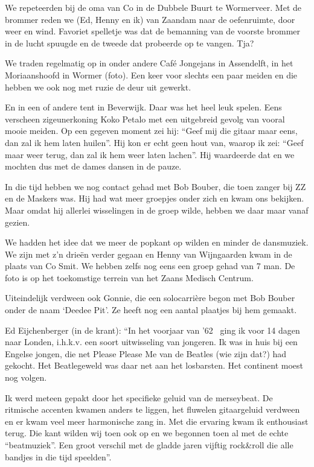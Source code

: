 \documentclass[10pt,twoside,openright]{memoir}
\begin{document}
We repeteerden bij de oma van Co in de Dubbele Buurt te Wormerveer. Met de brommer reden we (Ed, Henny en ik) van Zaandam naar de oefenruimte, door weer en wind. Favoriet spelletje was dat de bemanning van de voorste brommer in de lucht spuugde en de tweede dat probeerde op te vangen. Tja?

We traden regelmatig op in onder andere Café Jongejans in Assendelft, in het Moriaanshoofd in Wormer (foto). Een keer voor slechts een paar meiden en die hebben we ook nog met ruzie de deur uit gewerkt. 

En in een of andere tent in Beverwijk. Daar was het heel leuk spelen. Eens verscheen zigeunerkoning Koko Petalo met een uitgebreid gevolg van vooral mooie meiden. Op een gegeven moment zei hij: “Geef mij die gitaar maar eens, dan zal ik hem laten huilen”. Hij kon er echt geen hout van, waarop ik zei: “Geef maar weer terug, dan zal ik hem weer laten lachen”. Hij waardeerde dat en we mochten dus met de dames dansen in de pauze.

In die tijd hebben we nog contact gehad met Bob Bouber, die toen zanger bij ZZ en de Maskers was. Hij had wat meer groepjes onder zich en kwam ons bekijken. Maar omdat hij allerlei wisselingen in de groep wilde, hebben we daar maar vanaf gezien. 

We hadden het idee dat we meer de popkant op wilden en minder de dansmuziek. We zijn met z’n drieën verder gegaan en Henny van Wijngaarden kwam in de plaats van Co Smit. We hebben zelfs nog eens een groep gehad van 7 man. De foto is op het toekomstige terrein van het Zaans Medisch Centrum.

Uiteindelijk verdween ook Gonnie, die een solocarrière begon met Bob Bouber onder de naam ‘Deedee Pit’. Ze heeft nog een aantal plaatjes bij hem gemaakt.

Ed Eijchenberger (in de krant): “In het voorjaar van ’62  ging ik voor 14 dagen naar Londen, i.h.k.v. een soort uitwisseling van jongeren. Ik was in huis bij een Engelse jongen, die net Please Please Me van de Beatles (wie zijn dat?) had gekocht. Het Beatlegeweld was daar net aan het losbarsten. Het continent moest nog volgen. 

Ik werd meteen gepakt door het specifieke geluid van de merseybeat. De ritmische accenten kwamen anders te liggen, het fluwelen gitaargeluid verdween en er kwam veel meer harmonische zang in. Met die ervaring kwam ik enthousiast terug. Die kant wilden wij toen ook op en we begonnen toen al met de echte “beatmuziek”. Een groot verschil met de gladde jaren vijftig rock&roll die alle bandjes in die tijd speelden”.
\end{document}

